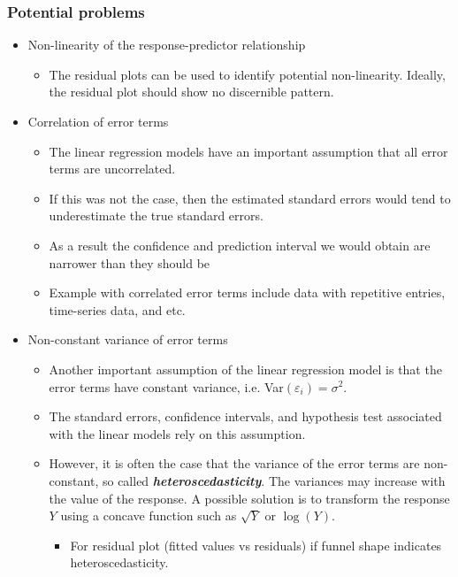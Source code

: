 \documentclass[11pt]{article}
\begin{document}
\subsubsection{Potential problems}
\begin{itemize}
    \item Non-linearity of the response-predictor relationship
        \begin{itemize}
            \item The residual plots can be used to identify potential non-linearity. Ideally, the residual plot should show no discernible pattern.
        \end{itemize}
    \item Correlation of error terms
        \begin{itemize}
            \item The linear regression models have an important assumption that all error terms are uncorrelated.
            \item If this was not the case, then the estimated standard errors would tend to underestimate the true standard errors.
            \item As a result the confidence and prediction interval we would obtain are narrower than they should be
            \item Example with correlated error terms include data with repetitive entries, time-series data, and etc.
        \end{itemize}
    \item Non-constant variance of error terms
        \begin{itemize}
            \item Another important assumption of the linear regression model is that the error terms have constant variance, i.e. Var$(\varepsilon_i) = \sigma^2$.
            \item The standard errors, confidence intervals, and hypothesis test associated with the linear models rely on this assumption.
            \item However, it is often the case that the variance of the error terms are non-constant, so called \textbf{\textit{heteroscedasticity}}. The variances may increase with the value of the response. A possible solution is to transform the response $Y$ using a concave function such as $\sqrt{Y}$ or $\log(Y)$.
                \begin{itemize}
                    \item For residual plot (fitted values vs residuals) if funnel shape indicates heteroscedasticity.

\end{itemize}
\end{itemize}
\end{itemize}
\end{document}
